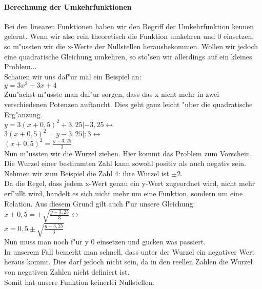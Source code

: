 \paragraph{Berechnung der Umkehrfunktionen}\hspace{12 cm}
Bei den linearen Funktionen haben wir den Begriff der Umkehrfunktion kennen gelernt. Wenn wir also rein theoretisch die Funktion umkehren und 0 einsetzen, so m"ussten wir die x-Werte der Nullstellen herausbekommen. Wollen wir jedoch eine quadratische Gleichung umkehren, so sto"sen wir allerdings auf ein kleines Problem... \vspace{0.5 cm}\\
Schauen wir uns daf"ur mal ein Beispiel an:\\
$y = 3x^2 + 3x + 4$\\
Zun"achst m"usste man daf"ur sorgen, dass das x nicht mehr in zwei verschiedenen Potenzen auftaucht. Dies geht ganz leicht "uber die quadratische Erg"anzung.\\
$y = 3(x + 0,5)^2 + 3,25 | -3,25\leftrightarrow$\\
$3(x+0,5)^2 = y-3,25 | :3 \leftrightarrow$\\
$(x+0,5)^2 = \frac{y-3,25}{3}$\\
Nun m"ussten wir die Wurzel ziehen. Hier kommt das Problem zum Vorschein.\\
Die Wurzel einer bestimmten Zahl kann sowohl positiv als auch negativ sein.\\
Nehmen wir zum Beispiel die Zahl 4: ihre Wurzel ist $\pm 2$.\\
Da die Regel, dass jedem x-Wert genau ein y-Wert zugeordnet wird, nicht mehr erf"ullt wird, handelt es sich nicht mehr um eine Funktion, sondern um eine Relation.
Aus diesem Grund gilt auch f"ur unsere Gleichung:\\
$x+0,5 =\pm \sqrt{\frac{y-3,25}{3}}\leftrightarrow$\\
$x=0,5 \pm \sqrt{\frac{y-3,25}{3}}$\\
Nun muss man noch f"ur y  0 einsetzen und gucken was passiert.\\
In unserem Fall bemerkt man schnell, dass unter der Wurzel ein negativer Wert heraus kommt. Dies darf jedoch nicht sein, da in den reellen Zahlen die Wurzel von negativen Zahlen nicht definiert ist.\\
Somit hat unsere Funktion keinerlei Nullstellen.

